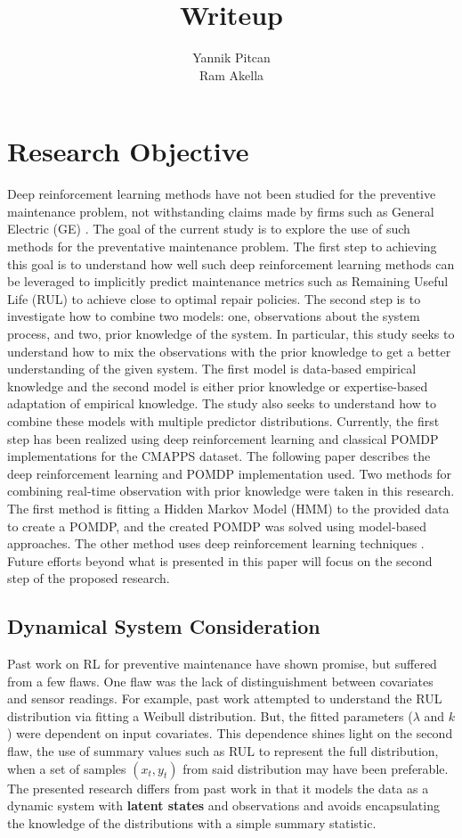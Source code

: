 \documentclass[english]{article}
\numberwithin{equation}{section}
\begin{document}
	
	\title{Writeup}
	
	\author{Yannik Pitcan \\
		Ram Akella
	}
	\maketitle
	
	\section*{Research Objective}
	Deep reinforcement learning methods have not been studied for the preventive maintenance problem, not withstanding claims made by firms such as General Electric (GE) \cite{GE}. The goal of the current study is to explore the use of such methods for the preventative maintenance problem.  The first step to achieving this goal is to understand how well such deep reinforcement learning methods can be leveraged to implicitly predict maintenance metrics such as Remaining Useful Life (RUL) to achieve close to optimal repair policies. The second step is to investigate how to combine two models: one, observations about the system process, and two, prior knowledge of the system. In particular, this study seeks to understand how to mix the observations with the prior knowledge to get a better understanding of the given system. The first model is data-based empirical knowledge and the second model is either prior knowledge or expertise-based adaptation of empirical knowledge. The study also seeks to understand how to combine these models with  multiple predictor distributions. Currently, the first step has been realized using deep reinforcement learning and classical POMDP implementations for the CMAPPS dataset. The following paper describes the deep reinforcement learning and POMDP implementation used. Two methods for combining real-time observation with prior knowledge were taken in this research. The first method is fitting a Hidden Markov Model (HMM) to the provided data to create a POMDP, and the created POMDP was solved using model-based approaches. The other method uses deep reinforcement learning techniques \cite{igl}.  Future efforts beyond what is presented in this paper will focus on the second step of the proposed research.
	
	\subsection*{Dynamical System Consideration}
	Past work on RL for preventive maintenance have shown promise, but suffered from a few flaws. One flaw was the lack of distinguishment between covariates and sensor readings. For example, past work attempted to understand the RUL distribution via fitting a Weibull distribution. But, the fitted parameters ($\lambda$ and $k$) were dependent on input covariates. This dependence shines light on the second flaw, the use of summary values such as RUL to represent the full distribution, when a set of samples $(x_t,y_t)$ from said distribution may have been preferable. The presented research differs from past work in that it models the data as a dynamic system with \textbf{latent states} and observations and avoids encapsulating the knowledge of the distributions with a simple summary statistic.
	
\end{document}

